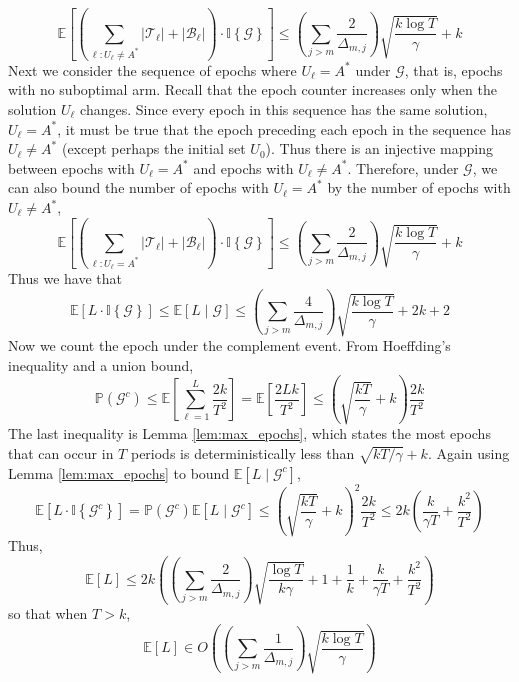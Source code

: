 \documentclass[opre,blindrev]{informs3}
\newcommand{\ind}[1]{\mathbb{I}\left\{#1\right\}}
\newcommand{\bE}[1]{{\mathbb{E}\left[#1\right]}}
\newcommand{\bP}[1]{{\mathbb{P}\left(#1\right)}}
\begin{document}
\begin{APPENDICES}
    \[\bE{\left(\sum_{\ell:U_{\ell}\neq A^*}|\mathcal{T}_{\ell}|+|\mathcal{B}_{\ell}|\right)\cdot \ind{\mathcal{G}}}\leq \left(\sum_{j>m}\frac{2}{\Delta_{m,j}}\right)\sqrt{\frac{k\log T}{\gamma}}+k\]
    Next we consider the sequence of epochs where \(U_{\ell}=A^*\) under \(\mathcal{G}\), that is, epochs with no suboptimal arm. Recall that the epoch counter increases only when the solution \(U_{\ell}\) changes. Since every epoch in this sequence has the same solution, \(U_{\ell}= A^*\), it must be true that the epoch preceding each epoch in the sequence has \(U_{\ell}\neq A^*\) (except perhaps the initial set \(U_0\)). Thus there is an injective mapping between epochs with \(U_{\ell}=A^*\) and epochs with \(U_{\ell}\neq A^*\). Therefore, under \(\mathcal{G}\), we can also bound the number of epochs with \(U_{\ell}=A^*\) by the number of epochs with \(U_{\ell}\neq A^*\),
    \[\bE{\left(\sum_{\ell:U_{\ell}= A^*}|\mathcal{T}_{\ell}|+|\mathcal{B}_{\ell}|\right)\cdot \ind{\mathcal{G}}}\leq \left(\sum_{j>m}\frac{2}{\Delta_{m,j}}\right)\sqrt{\frac{k\log T}{\gamma}}+k\]
    Thus we have that 
    \[\bE{L\cdot \ind{\mathcal{G}}}\leq \bE{L\mid \mathcal{G}}\leq \left(\sum_{j>m}\frac{4}{\Delta_{m,j}}\right)\sqrt{\frac{k\log T}{\gamma}}+2k+2\]
    Now we count the epoch under the complement event. From Hoeffding's inequality and a union bound,
    \[\bP{\mathcal{G}^c}\leq \bE{\sum_{\ell=1}^L \frac{2k}{T^2}}=\bE{\frac{2Lk}{T^2}}\leq \left(\sqrt{\frac{kT}{\gamma}}+k\right)\frac{2k}{T^2}\]
    The last inequality is Lemma \ref{lem:max_epochs}, which states the most epochs that can occur in \(T\) periods is deterministically less than \(\sqrt{kT /\gamma}+k\).
    Again using Lemma \ref{lem:max_epochs} to bound \(\bE{L\mid \mathcal{G}^c}\),
    \[\bE{L\cdot \ind{\mathcal{G}^c}}=\bP{\mathcal{G}^c}\bE{L\mid \mathcal{G}^c}\leq \left(\sqrt{\frac{kT}{\gamma}}+k\right)^2\frac{2k}{T^2}\leq 2k\left(\frac{k}{\gamma T}+\frac{k^2}{T^2}\right)\]
    Thus,
    \[\bE{L}\leq 2k\left(\left(\sum_{j>m}\frac{2}{\Delta_{m,j}}\right)\sqrt{\frac{\log T}{k\gamma}}+1+\frac{1}{k}+\frac{k}{\gamma T}+\frac{k^2}{T^2}\right)\]
    so that when \(T> k\),
    \[\bE{L}\in O\left(\left(\sum_{j>m}\frac{1}{\Delta_{m,j}}\right)\sqrt{\frac{k\log T}{\gamma}}\right)\]
\Halmos


\end{APPENDICES}
\end{document}
